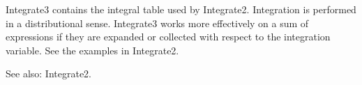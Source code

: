













Integrate3 contains the integral table used by Integrate2. Integration is performed in a distributional sense. Integrate3 works more
  effectively on a sum of expressions if they are expanded or collected with respect to the integration variable. See the examples in
  Integrate2.

See also:  Integrate2.





